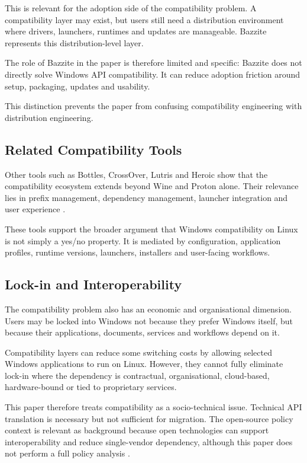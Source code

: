 \documentclass[conference]{IEEEtran}
\begin{document}
This is relevant for the adoption side of the compatibility problem. A compatibility layer may exist, but users still need a distribution environment where drivers, launchers, runtimes and updates are manageable. Bazzite represents this distribution-level layer.

The role of Bazzite in the paper is therefore limited and specific: Bazzite does not directly solve Windows API compatibility. It can reduce adoption friction around setup, packaging, updates and usability.

This distinction prevents the paper from confusing compatibility engineering with distribution engineering.

\subsection{Related Compatibility Tools}

Other tools such as Bottles, CrossOver, Lutris and Heroic show that the compatibility ecosystem extends beyond Wine and Proton alone. Their relevance lies in prefix management, dependency management, launcher integration and user experience \cite{bottlesDocs,codeweaversCrossover,lutris,heroicGamesLauncher}.

These tools support the broader argument that Windows compatibility on Linux is not simply a yes/no property. It is mediated by configuration, application profiles, runtime versions, launchers, installers and user-facing workflows.

\subsection{Lock-in and Interoperability}

The compatibility problem also has an economic and organisational dimension. Users may be locked into Windows not because they prefer Windows itself, but because their applications, documents, services and workflows depend on it.

Compatibility layers can reduce some switching costs by allowing selected Windows applications to run on Linux. However, they cannot fully eliminate lock-in where the dependency is contractual, organisational, cloud-based, hardware-bound or tied to proprietary services.

This paper therefore treats compatibility as a socio-technical issue. Technical API translation is necessary but not sufficient for migration. The open-source policy context is relevant as background because open technologies can support interoperability and reduce single-vendor dependency, although this paper does not perform a full policy analysis \cite{ecOpenSourceStrategy2020,euOpenSourceStrategy2026}.
\end{document}
